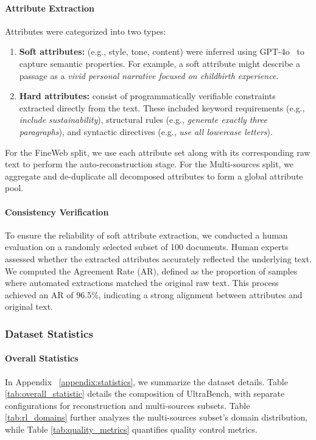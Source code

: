 
\paragraph{Attribute Extraction}

Attributes were categorized into two types:
\begin{enumerate}
    \item \textbf{Soft attributes:} (e.g., style, tone, content) were inferred using GPT-4o~\cite{achiam2023gpt} to capture semantic properties. For example, a soft attribute might describe a passage as a \textit{vivid personal narrative focused on childbirth experience}.
    \item \textbf{Hard attributes:} consist of programmatically verifiable constraints extracted directly from the text. These included keyword requirements (e.g., \textit{include sustainability}), structural rules (e.g., \textit{generate exactly three paragraphs}), and syntactic directives (e.g., \textit{use all lowercase letters}).
\end{enumerate}
For the FineWeb split, we use each attribute set along with its corresponding raw text to perform the auto-reconstruction stage. For the Multi-sources split, we aggregate and de-duplicate all decomposed attributes to form a global attribute pool.

\paragraph{Consistency Verification}
To ensure the reliability of soft attribute extraction, we conducted a human evaluation on a randomly selected subset of 100 documents. Human experts assessed whether the extracted attributes accurately reflected the underlying text. We computed the Agreement Rate (AR), defined as the proportion of samples where automated extractions matched the original raw text. This process achieved an AR of 96.5\%, indicating a strong alignment between attributes and original text.

\subsubsection{Dataset Statistics}
\paragraph{Overall Statistics}
In Appendix ~\ref{appendix:statistics}, we summarize the dataset details. Table \ref{tab:overall_statistic} details the composition of UltraBench, with separate configurations for reconstruction and multi-sources subsets. Table \ref{tab:rl_domains} further analyzes the multi-sources subset’s domain distribution, while Table \ref{tab:quality_metrics} quantifies quality control metrics. 

